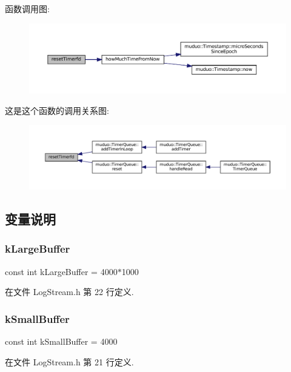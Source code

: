 函数调用图\+:
\nopagebreak
\begin{figure}[H]
\begin{center}
\leavevmode
\includegraphics[width=350pt]{namespacemuduo_1_1detail_a2a30bb501e8d9bb2da91ab353d1bc6fd_cgraph}
\end{center}
\end{figure}
这是这个函数的调用关系图\+:
\nopagebreak
\begin{figure}[H]
\begin{center}
\leavevmode
\includegraphics[width=350pt]{namespacemuduo_1_1detail_a2a30bb501e8d9bb2da91ab353d1bc6fd_icgraph}
\end{center}
\end{figure}


\subsection{变量说明}
\mbox{\label{namespacemuduo_1_1detail_a72d89caa2e467f089bb6cc480d73b884}} 
\subsubsection{\texorpdfstring{k\+Large\+Buffer}{kLargeBuffer}}
{\footnotesize\ttfamily const int k\+Large\+Buffer = 4000$\ast$1000}



在文件 Log\+Stream.\+h 第 22 行定义.

\mbox{\label{namespacemuduo_1_1detail_a01441c3dba82e5d4bad1ce2b39ff576b}} 
\subsubsection{\texorpdfstring{k\+Small\+Buffer}{kSmallBuffer}}
{\footnotesize\ttfamily const int k\+Small\+Buffer = 4000}



在文件 Log\+Stream.\+h 第 21 行定义.

